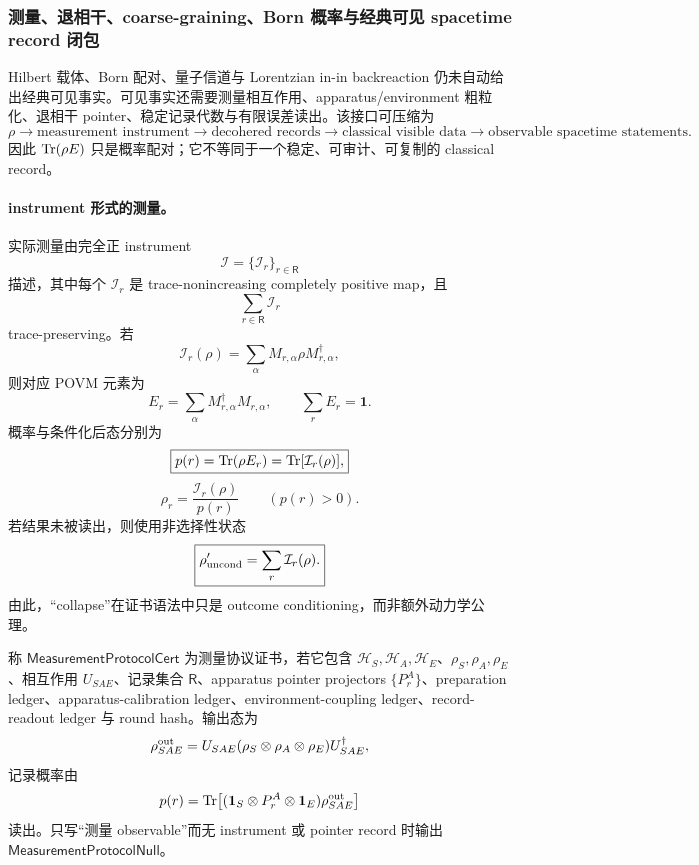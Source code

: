 \subsubsection{测量、退相干、coarse-graining、Born 概率与经典可见 spacetime record 闭包}\label{subsubsec:typed-address-biaxial-completion-measurement-decoherence-classical-record-closure}
Hilbert 载体、Born 配对、量子信道与 Lorentzian in-in backreaction 仍未自动给出经典可见事实。可见事实还需要测量相互作用、apparatus/environment 粗粒化、退相干 pointer、稳定记录代数与有限误差读出。该接口可压缩为
\[
\boxed{
\rho
\longrightarrow
\text{measurement instrument}
\longrightarrow
\text{decohered records}
\longrightarrow
\text{classical visible data}
\longrightarrow
\text{observable spacetime statements}.
}
\]
因此 \({\rm Tr}(\rho E)\) 只是概率配对；它不等同于一个稳定、可审计、可复制的 classical record。

\paragraph{instrument 形式的测量。}
实际测量由完全正 instrument
\[
\mathcal I=\{\mathcal I_r\}_{r\in\mathsf R}
\]
描述，其中每个 \(\mathcal I_r\) 是 trace-nonincreasing completely positive map，且
\[
\sum_{r\in\mathsf R}\mathcal I_r
\]
trace-preserving。若
\[
\mathcal I_r(\rho)
=
\sum_\alpha M_{r,\alpha}\rho M_{r,\alpha}^\dagger,
\]
则对应 POVM 元素为
\[
\boxed{
E_r
=
\sum_\alpha M_{r,\alpha}^\dagger M_{r,\alpha},
\qquad
\sum_rE_r=\mathbf 1.
}
\]
概率与条件化后态分别为
\[
\boxed{
p(r)
=
{\rm Tr}(\rho E_r)
=
{\rm Tr}[\mathcal I_r(\rho)],
}
\]
\[
\boxed{
\rho_r
=
\frac{\mathcal I_r(\rho)}{p(r)}
\qquad (p(r)>0).
}
\]
若结果未被读出，则使用非选择性状态
\[
\boxed{
\rho'_{\rm uncond}
=
\sum_r\mathcal I_r(\rho).
}
\]
由此，“collapse”在证书语法中只是 outcome conditioning，而非额外动力学公理。

\begin{definition}[测量协议证书]\label{def:typed-address-biaxial-completion-measurement-protocol-cert}
称 \(\mathsf{MeasurementProtocolCert}\) 为测量协议证书，若它包含 \(\mathcal H_S,\mathcal H_A,\mathcal H_E\)、\(\rho_S,\rho_A,\rho_E\)、相互作用 \(U_{SAE}\)、记录集合 \(\mathsf R\)、apparatus pointer projectors \(\{P_r^A\}\)、preparation ledger、apparatus-calibration ledger、environment-coupling ledger、record-readout ledger 与 round hash。输出态为
\[
\rho_{SAE}^{\rm out}
=
U_{SAE}(\rho_S\otimes\rho_A\otimes\rho_E)U_{SAE}^\dagger,
\]
记录概率由
\[
p(r)
=
{\rm Tr}\!\left[
(\mathbf 1_S\otimes P_r^A\otimes\mathbf 1_E)
\rho_{SAE}^{\rm out}
\right]
\]
读出。只写“测量 observable”而无 instrument 或 pointer record 时输出 \(\mathsf{MeasurementProtocolNull}\)。
\end{definition}


